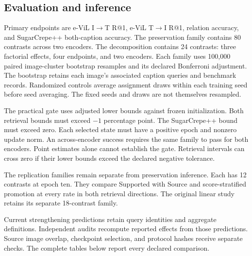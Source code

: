 \subsection{Evaluation and inference}
Primary endpoints are e-ViL I$\to$T R@1, e-ViL T$\to$I R@1, relation accuracy, and SugarCrepe++ both-caption accuracy.
The preservation family contains 80 contrasts across two encoders.
The decomposition contains 24 contrasts: three factorial effects, four endpoints, and two encoders.
Each family uses 100,000 paired image-cluster bootstrap resamples and its declared Bonferroni adjustment.
The bootstrap retains each image's associated caption queries and benchmark records.
Randomized controls average assignment draws within each training seed before seed averaging.
The fixed seeds and draws are not themselves resampled.

The practical gate uses adjusted lower bounds against frozen initialization.
Both retrieval bounds must exceed $-1$ percentage point.
The SugarCrepe++ bound must exceed zero.
Each selected state must have a positive epoch and nonzero update norm.
An across-encoder success requires the same family to pass for both encoders.
Point estimates alone cannot establish the gate.
Retrieval intervals can cross zero if their lower bounds exceed the declared negative tolerance.

The replication families remain separate from preservation inference.
Each has 12 contrasts at epoch ten.
They compare Supported with Source and score-stratified promotion at every rate in both retrieval directions.
The original linear study retains its separate 18-contrast family.

Current strengthening predictions retain query identities and aggregate definitions.
Independent audits recompute reported effects from those predictions.
Source image overlap, checkpoint selection, and protocol hashes receive separate checks.
The complete tables below report every declared comparison.
